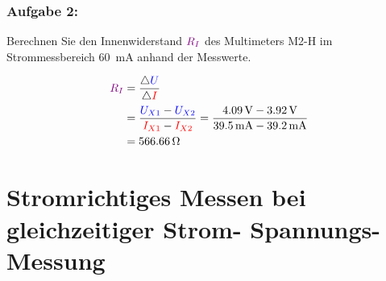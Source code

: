 \documentclass[a4paper,titlepage,parskip]{scrreprt}
\newcommand{\spannung}[1]{\textcolor{blue}{#1}}
\newcommand{\strom}[1]{\textcolor{red}{#1}}
\newcommand{\widerstand}[1]{\textcolor{violet}{#1}}
\begin{document}
            \subsubsection{Aufgabe 2:} Berechnen Sie den Innenwiderstand $\widerstand{R_I}$ des Multimeters M2-H im Strommessbereich \SI{60}{\milli\ampere} anhand der Messwerte.
            
            \begin{align*}
                \widerstand{R_I} &= \frac{\triangle \spannung{U}}{\triangle \strom{I}}\\
                &= \frac{\spannung{U_{X1}} - \spannung{U_{X2}}}{\strom{I_{X1}} - \strom{I_{X2}}}
                = \frac{\SI{4,09}{\volt} - \SI{3,92}{\volt}}{\SI{39,5}{\milli\ampere} - \SI{39,2}{\milli\ampere}}\\
                &= \SI{566,66}{\ohm}
            \end{align*}
        \pagebreak    
        \section{Stromrichtiges Messen bei gleichzeitiger Strom- Spannungs- Messung}
       
\end{document}

